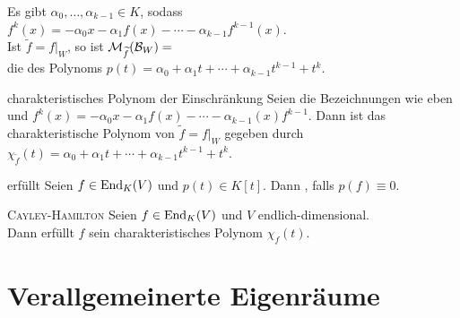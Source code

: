 \begin{Bem}
    Es gibt $\alpha_0, \dotsc, \alpha_{k-1} \in K$, sodass
    $f^k(x) = -\alpha_0 x - \alpha_1 f(x) - \dotsb -
    \alpha_{k-1} f^{k-1}(x)$. \\
    Ist $\widetilde{f} = f|_W$, so ist
    $\mathcal{M}_{\widetilde{f}}(\mathcal{B}_W) =$
     \\
    die  des Polynoms
    $p(t) = \alpha_0 + \alpha_1 t + \dotsb + \alpha_{k-1} t^{k-1} + t^k$.
\end{Bem}

\begin{Satz}{charakteristisches Polynom der Einschränkung}
    Seien die Bezeichnungen wie eben und
    $f^k(x) = -\alpha_0 x - \alpha_1 f(x) - \dotsb - \alpha_{k-1}(x) f^{k-1}$.
    Dann ist das charakteristische Polynom von $\widetilde{f} = f|_W$
    gegeben durch
    $\chi_{\widetilde{f}}(t) = \alpha_0 + \alpha_1 t + \dotsb +
    \alpha_{k-1} t^{k-1} + t^k$.
\end{Satz}

\begin{Def}{erfüllt}
    Seien $f \in \operatorname{End}_K(V)$ und $p(t) \in K[t]$.
    Dann , falls
    $p(f) \equiv 0$.
\end{Def}

\begin{Satz}{\textsc{Cayley}-\textsc{Hamilton}}
    Seien $f \in \operatorname{End}_K(V)$ und $V$ endlich-dimensional. \\
    Dann erfüllt $f$ sein charakteristisches Polynom $\chi_f(t)$.
\end{Satz}

\pagebreak

\section{%
    Verallgemeinerte Eigenräume%
}

